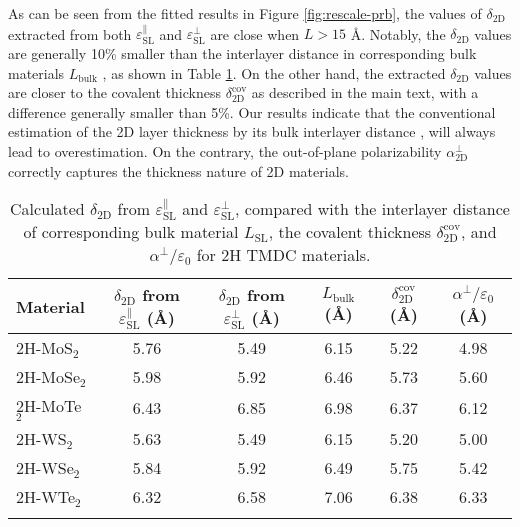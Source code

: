 \documentclass[manuscript=suppinfo,email=true,hyperref=true,keywords=false]{achemso}
\begin{document}
As can be seen from the fitted results in Figure
\ref{fig:rescale-prb}, the values of $\delta_{\mathrm{2D}}$ extracted
from both $\varepsilon_{\mathrm{SL}}^{\parallel}$ and
$\varepsilon_{\mathrm{SL}}^{\perp}$ are close when $L> 15$
{\AA}. Notably, the $\delta_{\mathrm{2D}}$ values are generally 10\%
smaller than the interlayer distance in corresponding bulk materials
$L_{\mathrm{bulk}}$ , as shown in Table \ref{tab:delta-L-DFt}. On the
other hand, the extracted $\delta_{\mathrm{2D}}$ values are closer to
the covalent thickness $\delta_{\mathrm{2D}}^{\mathrm{cov}}$ as
described in the main text, with a difference generally smaller than
5\%. Our results indicate that the conventional estimation of the 2D
layer thickness by its bulk interlayer distance
\cite{Matthes_2016,Laturia_2018}, will always lead to
overestimation. On the contrary, the out-of-plane polarizability
$\alpha_{\mathrm{2D}}^{\perp}$ correctly captures the thickness nature
of 2D materials.

\begin{table}[htbp]
  \centering
  \begin{tabular}[htbp]{lccccc}
  \hline{}
  Material & $\delta_{\mathrm{2D}}$ from $\varepsilon_{\mathrm{SL}}^{\parallel}$ ({\AA}) & $\delta_{\mathrm{2D}}$ from $\varepsilon_{\mathrm{SL}}^{\perp}$ ({\AA})& $L_{\mathrm{bulk}}$ ({\AA}) & $\delta_{\mathrm{2D}}^{\mathrm{cov}}$ ({\AA}) & $\alpha^{\perp}/\varepsilon_{0}$ ({\AA})\\
  \hline{}
  2H-MoS$_{2}$ & 5.76 & 5.49 & 6.15 & 5.22 & 4.98\\
  2H-MoSe$_{2}$ & 5.98 & 5.92 & 6.46 &  5.73 & 5.60\\
  2H-MoTe$_{2}$ & 6.43 & 6.85 & 6.98 & 6.37 & 6.12\\
  2H-WS$_{2}$ & 5.63 & 5.49 & 6.15 & 5.20 & 5.00\\
  2H-WSe$_{2}$ & 5.84 & 5.92 & 6.49 & 5.75 & 5.42\\
  2H-WTe$_{2}$ & 6.32 & 6.58 & 7.06 & 6.38 & 6.33\\
  \hline{}
\end{tabular}

\caption{Calculated $\delta_{\mathrm{2D}}$ from
  $\varepsilon_{\mathrm{SL}}^{\parallel}$ and
  $\varepsilon_{\mathrm{SL}}^{\perp}$, compared with the interlayer
  distance of corresponding bulk material $L_{\mathrm{SL}}$, the
  covalent thickness $\delta_{\mathrm{2D}}^{\mathrm{cov}}$, and
  $\alpha^{\perp}/\varepsilon_{0}$ for 2H TMDC materials.}
\label{tab:delta-L-DFt}
\end{table}
\end{document}

